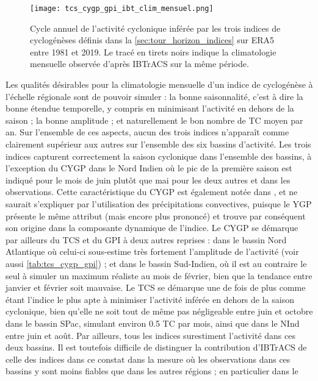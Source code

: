 \documentclass[../main.tex]{subfiles}
\begin{document}
\begin{figure}[tb]
    \centering
    \texttt{[image: tcs\_cygp\_gpi\_ibt\_clim\_mensuel.png]}
    \caption{Cycle annuel de l'activité cyclonique inférée par les trois indices de cyclogénèses définis dans la \cref{sec:tour_horizon_indices} sur
    ERA5 entre 1981 et 2019. Le tracé en tirets noirs indique la climatologie mensuelle observée d'après IBTrACS sur la même période.}
    \label{fig:tcs_cygp_gpi_clim_mensuel}
\end{figure}

Les qualités désirables pour la climatologie mensuelle d'un indice de cyclogénèse à l'échelle régionale sont de pouvoir simuler : la bonne saisonnalité, c'est à
dire la bonne étendue temporelle, y compris en minimisant l'activité en dehors de la saison ; la bonne amplitude ; et naturellement le bon nombre de TC moyen
par an. Sur l'ensemble de ces aspects, aucun des trois indices n'apparaît comme clairement supérieur aux autres sur l'ensemble des six bassins d'activité. Les
trois indices capturent correctement la saison cyclonique dans l'ensemble des bassins, à l'exception du CYGP dans le Nord Indien où le pic de la première saison est
indiqué pour le mois de juin plutôt que mai pour les deux autres et dans les observations. Cette caractéristique du CYGP est également notée dans
\textcite{menkes_comparison_2012}, et ne saurait s'expliquer par l'utilisation des précipitations convectives, puisque le YGP présente le même attribut (mais
encore plus prononcé) et trouve par conséquent son origine dans la composante dynamique de l'indice. Le CYGP se démarque par ailleurs du TCS et du GPI à deux
autres reprises : dans le bassin Nord Atlantique où celui-ci sous-estime très fortement l'amplitude de l'activité (voir aussi \cref{tab:tcs_cygp_gpi}) ; et dans
le bassin Sud-Indien, où il est au contraire le seul à simuler un maximum réaliste au mois de février, bien que la tendance entre janvier et février soit
mauvaise. Le TCS se démarque une de fois de plus comme étant l'indice le plus apte à minimiser l'activité inférée en dehors de la saison cyclonique, bien
qu'elle ne soit tout de même pas négligeable entre juin et octobre dans le bassin SPac, simulant environ \num{0.5} TC par mois, ainsi que dans le NInd entre
juin et août. Par ailleurs, tous les indices surestiment l'activité dans ces deux bassins. Il est toutefois difficile de distinguer la contribution d'IBTrACS de
celle des indices dans ce constat dans la mesure où les observations dans ces bassins y sont moins fiables que dans les autres régions ; en particulier dans le
\end{document}
